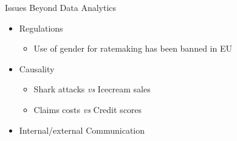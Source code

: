 \documentclass[ignorenonframetext,]{beamer}
\begin{document}
\begin{frame}{Issues Beyond Data Analytics}
\begin{itemize}
	\item  Regulations
		\begin{itemize}
			\item {} Use of gender for ratemaking has been banned in EU
		\end{itemize}
	\item {} Causality
				\begin{itemize}
			\item {} Shark attacks \textit{vs} Icecream sales
			\item {} Claims costs \textit{vs} Credit scores

		\end{itemize}

	\item {} Internal/external Communication
\end{itemize}
\end{frame}
\end{document}
